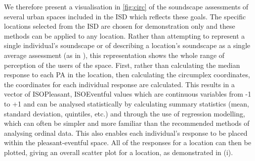 We therefore present a visualisation in \autoref{fig:circ} of the soundscape assessments of several urban spaces included in the ISD \citep{Mitchell2021International} which reflects these goals. The specific locations selected from the ISD are chosen for demonstration only and these methods can be applied to any location. Rather than attempting to represent a single individual's soundscape or of describing a location's soundscape as a single average assessment (as in \citep{Mitchell2021Investigating}), this representation shows the whole range of perception of the users of the space. First, rather than calculating the median response to each PA in the location, then calculating the circumplex coordinates, the coordinates for each individual response are calculated. This results in a vector of ISOPleasant, ISOEventful values which are continuous variables from -1 to +1 and can be analysed statistically by calculating summary statistics (mean, standard deviation, quintiles, etc.) and through the use of regression modelling, which can often be simpler and more familiar than the recommended methods of analysing ordinal data. This also enables each individual's response to be placed within the pleasant-eventful space. All of the responses for a location can then be plotted, giving an overall scatter plot for a location, as demonstrated in (i).

